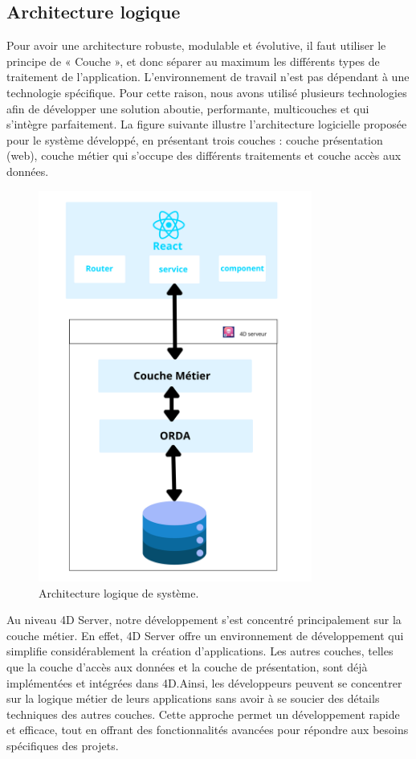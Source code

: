 \subsection{Architecture logique}

Pour avoir une architecture robuste, modulable et évolutive, il faut utiliser le principe
de « Couche », et donc séparer au maximum les différents types de traitement de l’application. L’environnement de travail n’est pas dépendant à une technologie spécifique.
Pour cette raison, nous avons utilisé plusieurs technologies afin de développer une solution aboutie, performante, multicouches et qui s’intègre parfaitement. La figure suivante
illustre l’architecture logicielle proposée pour le système développé, en présentant trois
couches : couche présentation (web), couche métier qui s’occupe des différents traitements
et couche accès aux données.


\begin{figure}[H]
    \centering
    \includegraphics[width=9cm]{Figures/architectureLogique.png}
    \caption{Architecture logique de système.}
\end{figure}

Au niveau 4D Server, notre développement s’est concentré principalement sur la couche
métier. En effet, 4D Server offre un environnement de développement qui simplifie considérablement la création d’applications. Les autres couches, telles que la couche d’accès
aux données et la couche de présentation, sont déjà implémentées et intégrées dans 4D.Ainsi, les développeurs peuvent se concentrer sur la logique métier de leurs applications
sans avoir à se soucier des détails techniques des autres couches. Cette approche permet
un développement rapide et efficace, tout en offrant des fonctionnalités avancées pour
répondre aux besoins spécifiques des projets.

